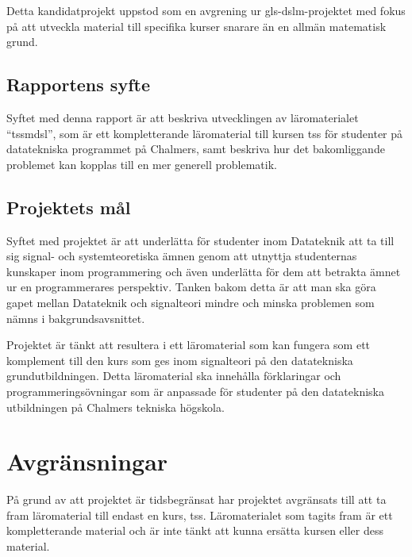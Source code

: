 \documentclass[12pt,a4paper,twoside,openright]{article}
\begin{document}
Detta kandidatprojekt uppstod som en avgrening ur \gls{gls-dslm}-projektet
med fokus på att utveckla material till specifika kurser snarare än en
allmän matematisk grund.

\subsection{Rapportens syfte}


Syftet med denna rapport är att beskriva utvecklingen av
läromaterialet ``\gls{tssmdsl}'', som är ett kompletterande läromaterial
till kursen \gls{tss} för studenter på datatekniska programmet på Chalmers,
samt beskriva hur det bakomliggande problemet kan kopplas till en mer
generell problematik.

\subsection{Projektets mål}
Syftet med projektet är att underlätta för studenter inom Datateknik
att ta till sig signal- och systemteoretiska ämnen genom att utnyttja
studenternas kunskaper inom programmering och även underlätta för dem
att betrakta ämnet ur en programmerares perspektiv. Tanken bakom detta
är att man ska göra gapet mellan Datateknik och signalteori mindre och
minska problemen som nämns i bakgrundsavsnittet.

Projektet är tänkt att resultera i ett läromaterial som kan fungera
som ett komplement till den kurs som ges inom signalteori på den
datatekniska grund\-utbildningen. Detta läromaterial ska innehålla
förklaringar och programmeringsövningar som är anpassade för studenter
på den datatekniska utbildningen på Chalmers tekniska högskola.

\newpage

\section{Avgränsningar}

På grund av att projektet är tidsbegränsat har projektet avgränsats
till att ta fram läromaterial till endast en kurs,
\gls{tss}. Läromaterialet som tagits fram är ett kompletterande
material och är inte tänkt att kunna ersätta kursen eller dess
material.
\end{document}
